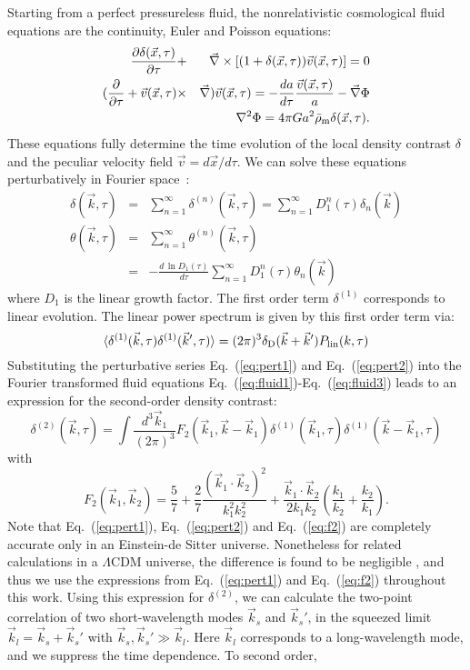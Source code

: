 \documentclass[prd,amsmath,amssymb,floatfix,superscriptaddress,nofootinbib,twocolumn]{revtex4-1}
\def\be{\begin{equation}}
\def\ee{\end{equation}}
\def\bea{\begin{eqnarray}}
\def\eea{\end{eqnarray}}
\newcommand{\vs}{\nonumber\\}
\newcommand{\vk}{\vec{k}}
\newcommand{\ec}[1]{Eq.~(\ref{eq:#1})}
\newcommand{\eql}[1]{\label{eq:#1}}
\begin{document}
\label{sec1}
Starting from a perfect pressureless fluid, the nonrelativistic cosmological fluid equations are the continuity, Euler and Poisson equations:
\bea
\frac{\partial \delta(\vec{x},\tau)}{\partial \tau} &+&\vec{\nabla}\times [(1+\delta(\vec{x},\tau))\vec{v}(\vec{x},\tau)] =0\eql{fluid1} \\
(\frac{\partial}{\partial \tau} +\vec{v}(\vec{x},\tau)&\times&\vec{\nabla})\vec{v}(\vec{x},\tau)=-\frac{da}{d\tau}\frac{\vec{v}(\vec{x},\tau)}{a}-\vec{\nabla}\Phi \eql{eulereq}\\
&&\nabla^2 \Phi = 4\pi G a^2 \bar{\rho}_{\rm m} \delta(\vec{x},\tau) .\eql{fluid3}
\eea
These equations fully determine the time evolution of the local density contrast $\delta$ and the peculiar velocity field $\vec{v}=d\vec{x}/d\tau$.
We can solve these equations perturbatively in Fourier space~\cite{Bernardeau:2002rev}:
\bea
{\delta}(\vk,\tau) &=&\sum_{n=1}^{\infty} {\delta}^{(n)}(\vk,\tau)=\sum_{n=1}^{\infty}D_1^{n}(\tau)\delta_{n}(\vk)  \eql{pert1}\\
{\theta}(\vk,\tau)&=&\sum_{n=1}^{\infty}{\theta}^{(n)}(\vk,\tau) \vs
&=&-\frac{d\,\ln D_1(\tau)}{d\tau}\sum_{n=1}^{\infty}D_1^{n}(\tau)\theta_{n}(\vk) \eql{pert2}
\eea
where $D_1$ is the linear growth factor. 
The first order term ${\delta}^{(1)}$ corresponds to linear evolution. The linear power spectrum is given by this first order term via:
\be 
\langle {\delta^{(1)}}(\vk,\tau){\delta^{(1)}}(\vk',\tau) \rangle =(2\pi)^3 \delta_{\rm D}(\vk+\vk')P_{\rm lin}(k,\tau) \eql{lin}
\ee 
Substituting the perturbative series \ec{pert1} and \ec{pert2} into the Fourier transformed fluid equations \ec{fluid1}-\ec{fluid3} leads to an expression for the second-order density contrast:
\be
{\delta}^{(2)}(\vk,\tau)=\int \frac{d^{3}\vk_{1}}{(2\pi)^3} F_2(\vk_1,\vk-\vk_1){\delta}^{(1)}(\vk_1,\tau) {\delta}^{(1)}(\vk-\vk_1,\tau) \eql{sorder} 
\ee
with 
\be
F_{2}(\vk_1,\vk_2)=\frac{5}{7}+\frac{2}{7}\frac{(\vk_1\cdot \vk_2)^2}{k_1^2 k_2^2}+\frac{\vk_1\cdot \vk_2}{2k_1k_2}(\frac{k_1}{k_2}+\frac{k_2}{k_1}).\eql{f2}
\ee
Note that \ec{pert1}, \ec{pert2} and \ec{f2} are completely accurate only in an Einstein-de Sitter universe. Nonetheless for related calculations in a $\Lambda$CDM universe, the difference is found to be negligible \cite{Takahashi:2008to}, and thus we use the expressions from \ec{pert1} and \ec{f2} throughout this work.
Using this expression for $\delta^{(2)}$, we can calculate the two-point correlation of two short-wavelength modes $\vk_s$ and $\vk_s'$, in the squeezed limit $\vk_l=\vk_s+\vk_s'$ with $\vk_s,\vk_s' \gg \vk_l$. Here $\vk_l$ corresponds to a long-wavelength mode, and we suppress the time dependence. To second order,
\end{document}
